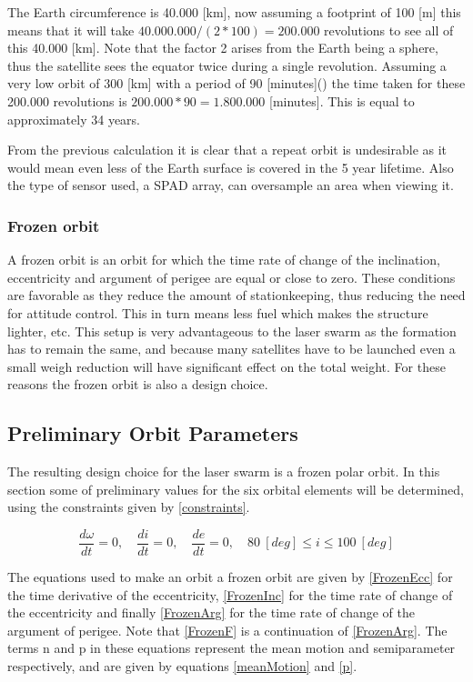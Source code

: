 The Earth circumference is 40.000 [km], now assuming a footprint of 100 [m] this means that it will take $40.000.000/(2*100)=200.000$ revolutions to see all of this 40.000 [km]. Note that the factor 2 arises from the Earth being a sphere, thus the satellite sees the equator twice during a single revolution. Assuming a very low orbit of 300 [km] with a period of 90 [minutes](\cite{larson}) the time taken for these 200.000 revolutions is $200.000*90=1.800.000$ [minutes]. This is equal to approximately 34 years.

From the previous calculation it is clear that a repeat orbit is undesirable as it would mean even less of the Earth surface is covered in the 5 year lifetime. Also the type of sensor used, a \ac{SPAD} array, can oversample an area when viewing it.

\subsubsection{Frozen orbit}
A frozen orbit is an orbit for which the time rate of change of the inclination, eccentricity and argument of perigee are equal or close to zero. These conditions are favorable as they reduce the amount of stationkeeping, thus reducing the need for attitude control. This in turn means less fuel which makes the structure lighter, etc.
This setup is very advantageous to the laser swarm as the formation has to remain the same, and because many satellites have to be launched even a small weigh reduction will have significant effect on the total weight. For these reasons the frozen orbit is also a design choice.

\subsection{Preliminary Orbit Parameters}
The resulting design choice for the laser swarm is a frozen polar orbit. In this section some of preliminary values for the six orbital elements will be determined, using the constraints given by \ref{constraints}.

\begin{equation}
\frac{{d\omega }}{{dt}} = 0,\quad \frac{{di }}{{dt}} = 0,\quad \frac{{de }}{{dt}} = 0,\quad 80\ [deg] \leq i \leq 100\ [deg]
\label{constraints}
\end{equation}

The equations used to make an orbit a frozen orbit are given by \ref{FrozenEcc} for the time derivative of the eccentricity, \ref{FrozenInc} for the time rate of change of the eccentricity and finally \ref{FrozenArg} for the time rate of change of the argument of perigee. Note that \ref{FrozenF} is a continuation of \ref{FrozenArg}. The terms n and p in these equations represent the mean motion and semiparameter respectively, and are given by equations \ref{meanMotion} and \ref{p}.

